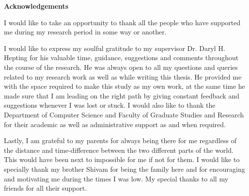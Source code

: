 
\begin{doublespace}
\begin{center}
\textbf{Acknowledgements}
\end{center}

I would like to take an opportunity to thank all the people who have supported me during my research period in 
some way or another.

I would like to express my soulful gratitude to my supervisor Dr. Daryl H. Hepting for his valuable time, 
guidance, 
suggestions and comments throughout the course of the research. 
He was always open to all my questions and queries related to my research work as well as while writing this thesis. 
He provided me with the space required to make this study as my own work, 
at the same time he made sure that I am leading on the right path by giving constant feedback and suggestions whenever I was lost or stuck. 
I would also like to thank the Department of Computer Science and Faculty of Graduate Studies and Research for their academic as well as administrative support as and when required.

Lastly, 
I am grateful to my parents for always being there for me regardless of the distance and time-difference between the two different parts of the world. 
This would have been next to impossible for me if not for them. 
I would like to specially thank my brother Shivam for being the family here and for encouraging and motivating me during the times I was low. 
My special thanks to all my friends for all their support.

\end{doublespace}

